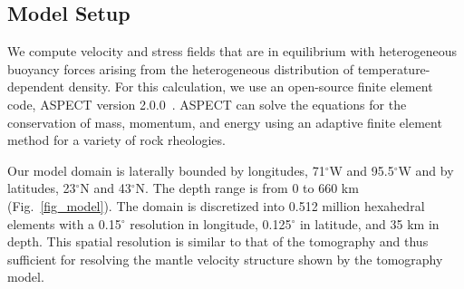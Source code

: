 \documentclass[draft,linenumbers]{agujournal2018}
\begin{document}
\subsection{Model Setup}
    
    We compute velocity and stress fields that are in equilibrium with heterogeneous buoyancy forces arising from the heterogeneous distribution of temperature-dependent density. For this calculation, we use an open-source finite element code, ASPECT version 2.0.0~\citep{KHB12,heister_aspect_methods2,rose_freesurface, aspect-doi-v2.0.0}. ASPECT can solve the equations for the conservation of mass, momentum, and energy using an adaptive finite element method for a variety of rock rheologies. 
    
     Our model domain is laterally bounded by longitudes, 71$^{\circ}$W and 95.5$^{\circ}$W and by latitudes, 23$^{\circ}$N and 43$^{\circ}$N. The depth range is from 0 to 660 km (Fig.~\ref{fig_model}). The domain is discretized into 0.512 million hexahedral elements with a 0.15$^{\circ}$ resolution in longitude, 0.125$^{\circ}$ in latitude, and 35 km in depth. This spatial resolution is similar to that of the tomography and thus sufficient for resolving the mantle velocity structure shown by the tomography model. 
\end{document}
